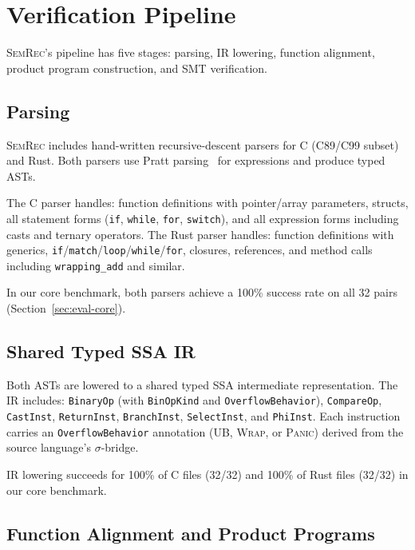 \documentclass[11pt,a4paper]{article}
\begin{document}
\section{Verification Pipeline}\label{sec:pipeline}

\textsc{SemRec}'s pipeline has five stages: parsing, IR lowering,
function alignment, product program construction, and SMT verification.

\subsection{Parsing}\label{sec:parsers}

\textsc{SemRec} includes hand-written recursive-descent parsers for
C (C89/C99 subset) and Rust. Both parsers use Pratt
parsing~\cite{pratt1973top} for expressions and produce typed ASTs.

The C parser handles: function definitions with pointer/array parameters,
structs, all statement forms (\texttt{if}, \texttt{while}, \texttt{for},
\texttt{switch}), and all expression forms including casts and ternary
operators.  The Rust parser handles: function definitions with generics,
\texttt{if}/\texttt{match}/\texttt{loop}/\texttt{while}/\texttt{for},
closures, references, and method calls including \texttt{wrapping\_add}
and similar.

In our core benchmark, both parsers achieve a 100\% success rate on
all 32 pairs (Section~\ref{sec:eval-core}).

\subsection{Shared Typed SSA IR}\label{sec:ir}

Both ASTs are lowered to a shared typed SSA intermediate representation.
The IR includes: \texttt{BinaryOp} (with \texttt{BinOpKind} and
\texttt{OverflowBehavior}), \texttt{CompareOp}, \texttt{CastInst},
\texttt{ReturnInst}, \texttt{BranchInst}, \texttt{SelectInst}, and
\texttt{PhiInst}.  Each instruction carries an \texttt{OverflowBehavior}
annotation (\textsc{UB}, \textsc{Wrap}, or \textsc{Panic}) derived from
the source language's $\sigma$-bridge.

IR lowering succeeds for 100\% of C files (32/32) and 100\% of Rust
files (32/32) in our core benchmark.

\subsection{Function Alignment and Product Programs}\label{sec:product}
\end{document}
